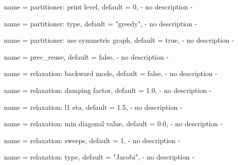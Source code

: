 \begin{parameter}{
    name    = {partitioner: print level},
    default = {0},
}
- no description -
\end{parameter}

\begin{parameter}{
    name    = {partitioner: type},
    default = {"greedy"},
}
- no description -
\end{parameter}

\begin{parameter}{
    name    = {partitioner: use symmetric graph},
    default = {true},
}
- no description -
\end{parameter}

\begin{parameter}{
    name    = {prec_reuse},
    default = {false},
}
- no description -
\end{parameter}

\begin{parameter}{
    name    = {relaxation: backward mode},
    default = {false},
}
- no description -
\end{parameter}

\begin{parameter}{
    name    = {relaxation: damping factor},
    default = {1.0},
}
- no description -
\end{parameter}

\begin{parameter}{
    name    = {relaxation: l1 eta},
    default = {1.5},
}
- no description -
\end{parameter}

\begin{parameter}{
    name    = {relaxation: min diagonal value},
    default = {0.0},
}
- no description -
\end{parameter}

\begin{parameter}{
    name    = {relaxation: sweeps},
    default = {1},
}
- no description -
\end{parameter}

\begin{parameter}{
    name    = {relaxation: type},
    default = {"Jacobi"},
}
- no description -
\end{parameter}

